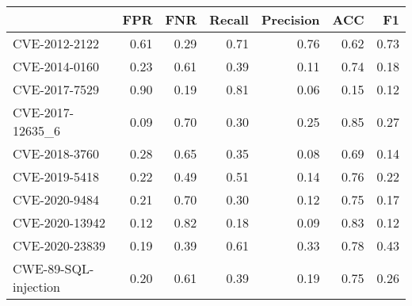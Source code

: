 \begin{tabular}{lrrrrrr}
\toprule
{} &  FPR &  FNR &  Recall &  Precision &  ACC &   F1 \\
\midrule
CVE-2012-2122        & 0.61 & 0.29 &    0.71 &       0.76 & 0.62 & 0.73 \\
CVE-2014-0160        & 0.23 & 0.61 &    0.39 &       0.11 & 0.74 & 0.18 \\
CVE-2017-7529        & 0.90 & 0.19 &    0.81 &       0.06 & 0.15 & 0.12 \\
CVE-2017-12635\_6     & 0.09 & 0.70 &    0.30 &       0.25 & 0.85 & 0.27 \\
CVE-2018-3760        & 0.28 & 0.65 &    0.35 &       0.08 & 0.69 & 0.14 \\
CVE-2019-5418        & 0.22 & 0.49 &    0.51 &       0.14 & 0.76 & 0.22 \\
CVE-2020-9484        & 0.21 & 0.70 &    0.30 &       0.12 & 0.75 & 0.17 \\
CVE-2020-13942       & 0.12 & 0.82 &    0.18 &       0.09 & 0.83 & 0.12 \\
CVE-2020-23839       & 0.19 & 0.39 &    0.61 &       0.33 & 0.78 & 0.43 \\
CWE-89-SQL-injection & 0.20 & 0.61 &    0.39 &       0.19 & 0.75 & 0.26 \\
\bottomrule
\end{tabular}

